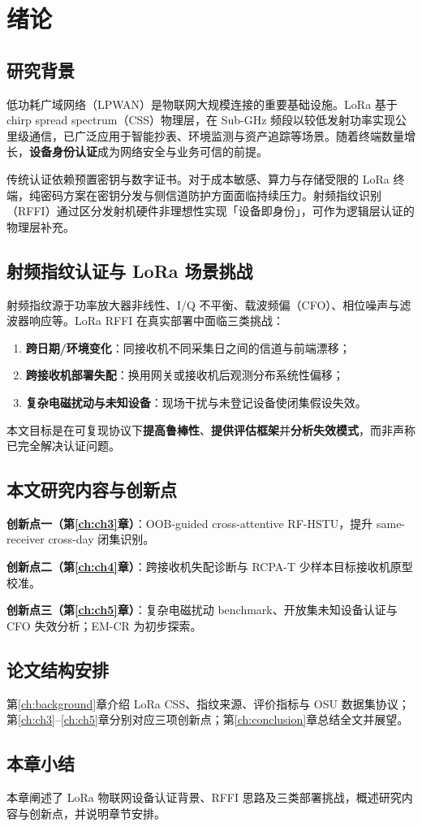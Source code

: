 \chapter{绪论}
\label{ch:intro}

\section{研究背景}

低功耗广域网络（LPWAN）是物联网大规模连接的重要基础设施。LoRa 基于 chirp spread spectrum（CSS）物理层，在 Sub-GHz 频段以较低发射功率实现公里级通信，已广泛应用于智能抄表、环境监测与资产追踪等场景。随着终端数量增长，\textbf{设备身份认证}成为网络安全与业务可信的前提。

传统认证依赖预置密钥与数字证书。对于成本敏感、算力与存储受限的 LoRa 终端，纯密码方案在密钥分发与侧信道防护方面面临持续压力。射频指纹识别（RFFI）通过区分发射机硬件非理想性实现「设备即身份」，可作为逻辑层认证的物理层补充。

\section{射频指纹认证与 LoRa 场景挑战}

射频指纹源于功率放大器非线性、I/Q 不平衡、载波频偏（CFO）、相位噪声与滤波器响应等。LoRa RFFI 在真实部署中面临三类挑战：

\begin{enumerate}
  \item \textbf{跨日期/环境变化}：同接收机不同采集日之间的信道与前端漂移；
  \item \textbf{跨接收机部署失配}：换用网关或接收机后观测分布系统性偏移；
  \item \textbf{复杂电磁扰动与未知设备}：现场干扰与未登记设备使闭集假设失效。
\end{enumerate}

本文目标是在可复现协议下\textbf{提高鲁棒性}、\textbf{提供评估框架}并\textbf{分析失效模式}，而非声称已完全解决认证问题。

\section{本文研究内容与创新点}

\textbf{创新点一（第\ref{ch:ch3}章）}：OOB-guided cross-attentive RF-HSTU，提升 same-receiver cross-day 闭集识别。

\textbf{创新点二（第\ref{ch:ch4}章）}：跨接收机失配诊断与 RCPA-T 少样本目标接收机原型校准。

\textbf{创新点三（第\ref{ch:ch5}章）}：复杂电磁扰动 benchmark、开放集未知设备认证与 CFO 失效分析；EM-CR 为初步探索。

\section{论文结构安排}

第\ref{ch:background}章介绍 LoRa CSS、指纹来源、评价指标与 OSU 数据集协议；第\ref{ch:ch3}--\ref{ch:ch5}章分别对应三项创新点；第\ref{ch:conclusion}章总结全文并展望。

\section{本章小结}

本章阐述了 LoRa 物联网设备认证背景、RFFI 思路及三类部署挑战，概述研究内容与创新点，并说明章节安排。
